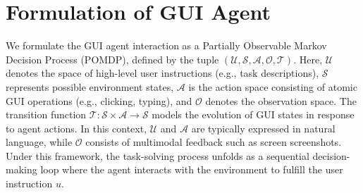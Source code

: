 \documentclass{article}
\theoremstyle{plain}
\theoremstyle{definition}
\theoremstyle{remark}
\newcommand{\lilei}[1]{\textcolor{orange}{#1 -lilei}}
\begin{document}
\section{Formulation of GUI Agent}
\label{sec: task formation}



We formulate the GUI agent interaction as a Partially Observable Markov Decision Process (POMDP), defined by the tuple $(\mathcal{U}, \mathcal{S}, \mathcal{A}, \mathcal{O}, \mathcal{T})$. 
Here, $\mathcal{U}$ denotes the space of high-level user instructions (e.g., task descriptions), $\mathcal{S}$ represents possible environment states, $\mathcal{A}$ is the action space consisting of atomic GUI operations (e.g., clicking, typing), and $\mathcal{O}$ denotes the observation space. 
The transition function $\mathcal{T}: \mathcal{S} \times \mathcal{A} \rightarrow \mathcal{S}$ models the evolution of GUI states in response to agent actions. 
In this context, $\mathcal{U}$ and $\mathcal{A}$ are typically expressed in natural language, while $\mathcal{O}$ consists of multimodal feedback such as screen screenshots. 
Under this framework, the task-solving process unfolds as a sequential decision-making loop where the agent interacts with the environment to fulfill the user instruction $u$.
\end{document}
